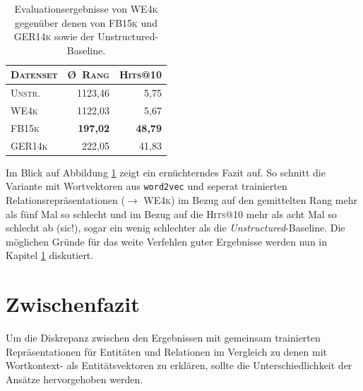 \begin{table}[h]
  \centering
  \begin{tabular}{lrr}
    \toprule[1.5pt]
    \textsc{Datenset} & \textsc{\O\ Rang} & \textsc{Hits@10} \\
     \toprule
     \textsc{Unstr.} & 1123,46 & 5,75 \\
     \textsc{WE4k} & 1122,03 & 5,67 \\
     \textsc{FB15k} & \textbf{197,02} & \textbf{48,79} \\
     \textsc{GER14k} & 222,05 & 41,83 \\
    \bottomrule[1.25pt]
  \end{tabular}
  \caption[Resultate auf mit Wordvektoren auf \textsc{WE3k}]{Evaluationsergebnisse von \textsc{WE4k} gegenüber denen
  von \textsc{FB15k} und \textsc{GER14k} sowie der Unstructured-Baseline.\label{fig:eval-we4k}}
\end{table}

Im Blick auf Abbildung \ref{fig:eval-we4k} zeigt ein ernüchterndes Fazit auf. So schnitt die Variante
mit Wortvektoren aus \verb|word2vec| und seperat trainierten Relationsrepräsentationen ($\rightarrow$ \textsc{WE4k}) im Bezug auf
den gemittelten Rang mehr als fünf Mal so schlecht und im Bezug auf die \textsc{Hits@10} mehr als acht Mal so schlecht ab (sic!),
sogar ein wenig schlechter als die \emph{Unstructured}-Baseline.
Die möglichen Gründe für das weite Verfehlen guter Ergebnisse werden nun in Kapitel \ref{sec:we4k-zwifa} diskutiert.

\section{Zwischenfazit}\label{sec:we4k-zwifa}

Um die Diskrepanz zwischen den Ergebnissen mit gemeinsam trainierten Repräsentationen für Entitäten und Relationen im Vergleich
zu denen mit Wortkontext- als Entitätsvektoren zu erklären, sollte die Unterschiedlichkeit der Ansätze hervorgehoben
werden.\\

